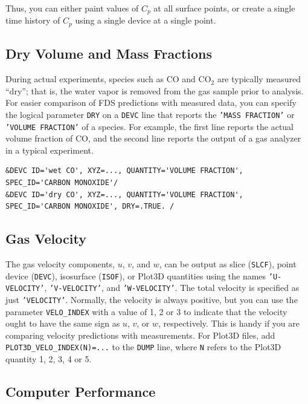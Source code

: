 \documentclass[11pt]{book}
\newcommand{\ct}{\tt\small}
\begin{document}
\noindent
Thus, you can either paint values of $C_p$ at all surface points, or create a single time history of $C_p$ using a single device at a single point.

\subsection{Dry Volume and Mass Fractions}
\label{info:dry}

During actual experiments, species such as CO and CO$_2$ are typically measured ``dry''; that is, the water
vapor is removed from the gas sample prior to analysis.  For easier comparison of FDS predictions with measured data,
you can specify the logical parameter {\ct DRY} on a {\ct DEVC} line that reports the {\ct 'MASS FRACTION'} or
{\ct 'VOLUME FRACTION'} of a species.  For example, the first line reports
the actual volume fraction of CO, and the second line reports the output of a gas analyzer in a typical experiment.

\footnotesize
\begin{verbatim}
&DEVC ID='wet CO', XYZ=..., QUANTITY='VOLUME FRACTION', SPEC_ID='CARBON MONOXIDE'/
&DEVC ID='dry CO', XYZ=..., QUANTITY='VOLUME FRACTION', SPEC_ID='CARBON MONOXIDE', DRY=.TRUE. /
\end{verbatim}
\normalsize


\subsection{Gas Velocity}
\label{info:velocity}

The gas velocity components, $u$, $v$, and $w$, can be output as slice ({\ct SLCF}), point device ({\ct DEVC}), isosurface ({\ct ISOF}), or Plot3D quantities using
the names {\ct 'U-VELOCITY'}, {\ct 'V-VELOCITY'}, and {\ct 'W-VELOCITY'}.
The total velocity is specified as just {\ct 'VELOCITY'}. Normally, the velocity is always positive, but you can use the parameter {\ct VELO\_INDEX} with a value
of 1, 2 or 3 to indicate that the velocity ought to have the same sign as $u$, $v$, or $w$, respectively. This is handy if you are comparing velocity predictions
with measurements. For Plot3D files, add {\ct PLOT3D\_VELO\_INDEX(N)=...} to the {\ct DUMP} line, where {\ct N} refers to the Plot3D quantity 1, 2, 3, 4 or 5.


\subsection{Computer Performance}
\label{info:TIMING}
\end{document}
